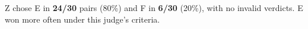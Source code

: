 Z chose E in \textbf{24/30} pairs (80\%) and F in \textbf{6/30} (20\%),
with no invalid verdicts. E won more often under this judge's criteria.
